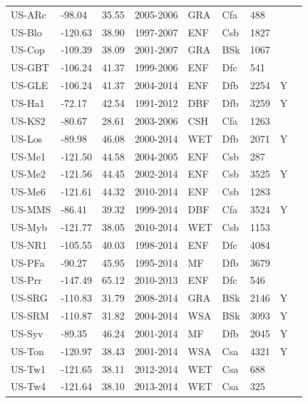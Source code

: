 \documentclass{myreport}
\begin{document}
\begin{longtable}{lllllllll}
  US-ARc & -98.04 & 35.55 & 2005-2006 & GRA & Cfa & 488 &  & \citet{US-ARc} \\ 
  US-Blo & -120.63 & 38.90 & 1997-2007 & ENF & Csb & 1827 &  & \citet{US-Blo} \\ 
  US-Cop & -109.39 & 38.09 & 2001-2007 & GRA & BSk & 1067 &  & \citet{US-Cop} \\ 
  US-GBT & -106.24 & 41.37 & 1999-2006 & ENF & Dfc & 541 &  & \citet{US-GBT} \\ 
  US-GLE & -106.24 & 41.37 & 2004-2014 & ENF & Dfb & 2254 & Y & \citet{US-GLE} \\ 
  US-Ha1 & -72.17 & 42.54 & 1991-2012 & DBF & Dfb & 3259 & Y & \citet{US-Ha1} \\ 
  US-KS2 & -80.67 & 28.61 & 2003-2006 & CSH & Cfa & 1263 &  & \citet{US-KS2} \\ 
  US-Los & -89.98 & 46.08 & 2000-2014 & WET & Dfb & 2071 & Y & \citet{US-Los} \\ 
  US-Me1 & -121.50 & 44.58 & 2004-2005 & ENF & Csb & 287 &  & \citet{US-Me1} \\ 
  US-Me2 & -121.56 & 44.45 & 2002-2014 & ENF & Csb & 3525 & Y & \citet{US-Me2} \\ 
  US-Me6 & -121.61 & 44.32 & 2010-2014 & ENF & Csb & 1283 &  & \citet{US-Me6} \\ 
  US-MMS & -86.41 & 39.32 & 1999-2014 & DBF & Cfa & 3524 & Y & \citet{US-MMS} \\ 
  US-Myb & -121.77 & 38.05 & 2010-2014 & WET & Csb & 1153 &  & \citet{US-Myb} \\ 
  US-NR1 & -105.55 & 40.03 & 1998-2014 & ENF & Dfc & 4084 &  & \citet{US-NR1} \\ 
  US-PFa & -90.27 & 45.95 & 1995-2014 & MF & Dfb & 3679 &  & \citet{US-PFa} \\ 
  US-Prr & -147.49 & 65.12 & 2010-2013 & ENF & Dfc & 546 &  & \citet{US-Prr} \\ 
  US-SRG & -110.83 & 31.79 & 2008-2014 & GRA & BSk & 2146 & Y & \citet{US-SRG} \\ 
  US-SRM & -110.87 & 31.82 & 2004-2014 & WSA & BSk & 3093 & Y & \citet{US-SRM} \\ 
  US-Syv & -89.35 & 46.24 & 2001-2014 & MF & Dfb & 2045 & Y & \citet{US-Syv} \\ 
  US-Ton & -120.97 & 38.43 & 2001-2014 & WSA & Csa & 4321 & Y & \citet{US-Ton} \\ 
  US-Tw1 & -121.65 & 38.11 & 2012-2014 & WET & Csa & 688 &  & \citet{US-Tw1} \\ 
  US-Tw4 & -121.64 & 38.10 & 2013-2014 & WET & Csa & 325 &  & \citet{US-Tw4} \\ 

\end{longtable}
\end{document}
